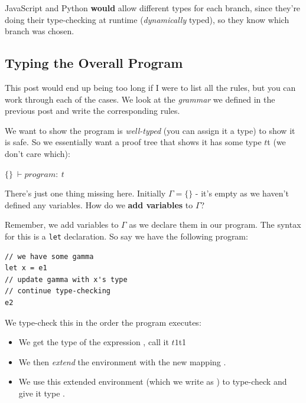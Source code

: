 {{JavaScript and Python \textbf{would} allow different types for each
branch, since they're doing their type-checking at runtime
(\emph{dynamically} typed), so they know which branch was chosen.

\hypertarget{typing-the-overall-program}{%
\subsection{\texorpdfstring{\protect\hyperlink{typing-the-overall-program}{}Typing
the Overall
Program}{Typing the Overall Program}}\label{typing-the-overall-program}}

This post would end up being too long if I were to list all the rules,
but you can work through each of the cases. We look at the
\emph{grammar} we defined in the previous post and write the
corresponding rules.

We want to show the program is \emph{well-typed} (you can assign it a
type) to show it is safe. So we essentially want a proof tree that shows
it has some type {{{\(t\)}{{{}{t}}}}} (we don't care which):

{{\(\{\}\  \vdash program:\ t\)}}

There's just one thing missing here. Initially
{{{\(\Gamma = \{\}\)}}} - it's empty as we
haven't defined any variables. How do we \textbf{add variables} to
{{\(\Gamma\)}}?

Remember, we add variables to {{{\(\Gamma\)}}} as we declare
them in our program. The syntax for this is a \texttt{let} declaration.
So say we have the following program:


\begin{verbatim}
// we have some gamma
let x = e1
// update gamma with x's type
// continue type-checking
e2
\end{verbatim}

We type-check this in the order the program executes:

\begin{itemize}
\tightlist
\item
  We get the type of the expression
  {{}} , call
  it {{{\(t1\)}{{{}{t}{1}}}}}
\item
  We then \emph{extend} the environment {{}} with
  the new mapping
  {{}}.
\item
  We use this extended environment (which we write as
  {{}}
  ) to type-check
  {{}} and
  give it type
  {{}}.
\end{itemize}

}}

